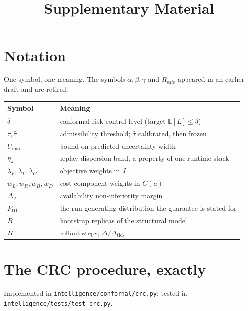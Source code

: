\documentclass[journal]{IEEEtran}
\begin{document}
\title{Supplementary Material}
\author{}
\maketitle

\section{Notation}
One symbol, one meaning. The symbols \(\alpha,\beta,\gamma\) and \(R_{\mathrm{safe}}\)
appeared in an earlier draft and are retired.

\begin{table}[!h]\centering\footnotesize
\begin{tabular}{@{}ll@{}}
\toprule
Symbol & Meaning \\
\midrule
$\delta$ & conformal risk-control level (target $\mathbb{E}[L]\le\delta$)\\
$\tau,\hat\tau$ & admissibility threshold; $\hat\tau$ calibrated, then frozen\\
$U_{\max}$ & bound on predicted uncertainty width\\
$\eta_J$ & replay dispersion band, a property of one runtime stack\\
$\lambda_F,\lambda_L,\lambda_C$ & objective weights in $J$\\
$w_L,w_R,w_B,w_D$ & cost-component weights in $C(a)$\\
$\Delta_A$ & availability non-inferiority margin\\
$P_{\mathrm{ID}}$ & the run-generating distribution the guarantee is stated for\\
$B$ & bootstrap replicas of the structural model\\
$H$ & rollout steps, $\Delta/\Delta_{\mathrm{tick}}$\\
\bottomrule
\end{tabular}
\end{table}

\section{The CRC procedure, exactly}
\label{sec:crc}
Implemented in \texttt{intelligence/conformal/crc.py}; tested in
\texttt{intelligence/tests/test\_crc.py}.
\end{document}
